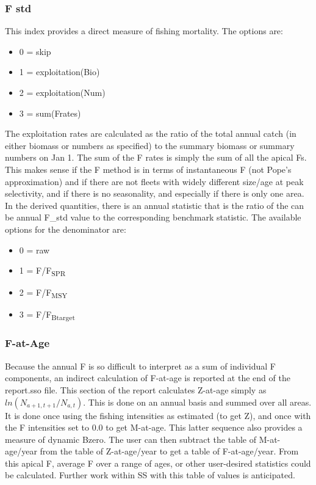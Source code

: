 \subsubsection{F std}
This index provides a direct measure of fishing mortality.  The options are:
\begin{itemize}
	\item 0 = skip
	\item 1 = exploitation(Bio)
	\item 2 = exploitation(Num)
	\item 3 = sum(Frates)
\end{itemize}
The exploitation rates are calculated as the ratio of the total annual catch (in either biomass or numbers as specified) to the summary biomass or summary numbers on Jan 1.  The sum of the F rates is simply the sum of all the apical Fs.  This makes sense if the F method is in terms of instantaneous F (not Pope’s approximation) and if there are not fleets with widely different size/age at peak selectivity, and if there is no seasonality, and especially if there is only one area.  In the derived quantities, there is an annual statistic that is the ratio of the can be annual F\_std value to the corresponding benchmark statistic.  The available options for the denominator are:
\begin{itemize}
	\item 0 = raw
	\item 1 = F/F\textsubscript {SPR}
	\item 2 = F/F\textsubscript {MSY}
	\item 3 = F/F\textsubscript {Btarget}
\end{itemize}

\subsubsection{F-at-Age}
Because the annual F is so difficult to interpret as a sum of individual F components, an indirect calculation of F-at-age is reported at the end of the report.sso file.  This section of the report calculates Z-at-age simply as $ln(N_{a+1,t+1}/N_{a,t})$.  This is done on an annual basis and summed over all areas.  It is done once using the fishing intensities as estimated (to get Z), and once with the F intensities set to 0.0 to get M-at-age.  This latter sequence also provides a measure of dynamic Bzero.  The user can then subtract the table of M-at-age/year from the table of Z-at-age/year to get a table of F-at-age/year.  From this apical F, average F over a range of ages, or other user-desired statistics could be calculated.  Further work within SS with this table of values is anticipated.

